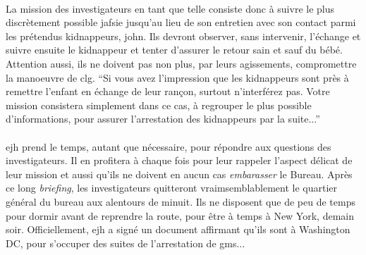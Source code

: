 \paragraph{} La mission des investigateurs en tant que telle consiste donc à suivre le plus discrètement possible \gls{jafsie} jusqu'au lieu de son
entretien avec son contact parmi les prétendus kidnappeurs, \gls{john}. Ils devront observer, sans intervenir, l'échange et suivre ensuite le 
kidnappeur et tenter d'assurer le retour sain et sauf du bébé. Attention aussi, ils ne doivent pas non plus, par leurs agissements, compromettre 
la manoeuvre de \gls{clg}. ``Si vous avez l'impression que les kidnappeurs sont près à remettre l'enfant en échange de leur rançon, surtout 
n'interférez pas. Votre mission consistera simplement dans ce cas, à regrouper le plus possible d'informations, pour assurer l'arrestation des
kidnappeurs par la suite...''

\paragraph{} \gls{ejh} prend le temps, autant que nécessaire, pour répondre aux questions des investigateurs. Il en profitera à chaque fois
pour leur rappeler l'aspect délicat de leur mission et aussi qu'ils ne doivent en aucun cas \emph{embarasser} le Bureau. Après ce long 
\emph{briefing}, les investigateurs quitteront vraimsemblablement le quartier général du bureau aux alentours de minuit. Ils ne disposent que
de peu de temps pour dormir avant de reprendre la route, pour être à temps à New York, demain soir. Officiellement, \gls{ejh} a signé un document affirmant
qu'ils sont à Washington DC, pour s'occuper des suites de l'arrestation de \gls{gms}...